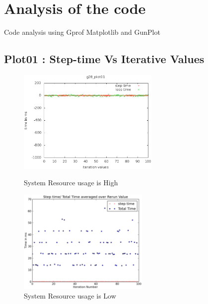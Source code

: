 \documentclass[a4paper,11pt]{article}
\begin{document}
\section{Analysis of the code}
Code analysis using Gprof Matplotlib and GunPlot
\subsection{Plot01 : Step-time Vs Iterative Values}
 	\begin{figure}[ht]
	\begin{minipage}[ht]{0.5\linewidth}
	\includegraphics[height=50mm]{plots/g28_project_plot01.eps}
	\caption{System Resource usage is High }	
	\label{fig:ResourceIntensivePlot01}
	\end{minipage}	
	\begin{minipage}[ht]{0.5\linewidth}
	\includegraphics[height=50mm]{plots1/g28_project_plot01.eps}
	\caption{System Resource usage is Low }
	\label{fig:ResourceIntensivePlot01a}
	\end{minipage}	
	\end{figure}
\end{document}
